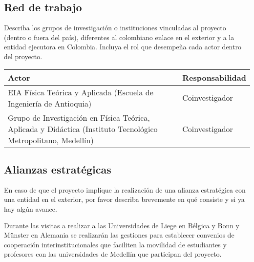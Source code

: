 \subsection{Red de trabajo}
\begin{instrucciones}
  Describa los grupos de investigación o instituciones vinculadas al
  proyecto (dentro o fuera del país), diferentes al colombiano enlace
  en el exterior y a la entidad ejecutora en Colombia. Incluya el rol
  que desempeña cada actor dentro del proyecto.
\end{instrucciones}

\begin{tabular}{|p{6cm}|l|}\hline
Actor & Responsabilidad\\\hline  
EIA Física Teórica y Aplicada 
(Escuela de Ingeniería de Antioquia)& Coinvestigador\\\hline
Grupo de Investigación en Física Teórica, Aplicada y Didáctica
(Instituto Tecnológico Metropolitano, Medellín)&Coinvestigador \\\hline
\end{tabular}

\subsection{Alianzas estratégicas}
\begin{instrucciones}
  En caso de que el proyecto implique la realización de una alianza
  estratégica con una entidad en el exterior, por favor describa
  brevemente en qué consiste y si ya hay algún avance.
\end{instrucciones}
Durante las visitas a realizar a las Universidades de Liege en Bélgica
y Bonn y M\"unster en Alemania se realizarán las gestiones para
establecer convenios de cooperación interinstitucionales que faciliten
la movilidad de estudiantes y profesores con las universidades de
Medellín que participan del proyecto.
